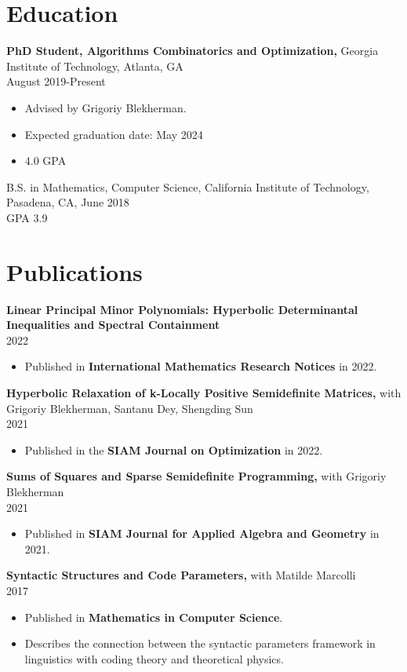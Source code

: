 \documentclass[margin]{res}
\begin{document}
 
 

\begin{resume} 

\section{Education} 
 {\bf PhD Student, Algorithms Combinatorics and Optimization,} Georgia Institute of Technology, Atlanta, GA\\ August 2019-Present
 \begin{itemize} \itemsep -2pt  %
 \item Advised by Grigoriy Blekherman.
 \item Expected graduation date: May 2024
 \item 4.0 GPA
 \end{itemize}

B.S. in Mathematics, Computer Science, California Institute of Technology, Pasadena, CA, June 2018 \\
GPA 3.9

\section{Publications}
{\bf  Linear Principal Minor Polynomials: Hyperbolic Determinantal Inequalities and Spectral Containment } \\ 2022
\begin{itemize} \itemsep -2pt %
\item Published in \textbf{International Mathematics Research Notices} in 2022.
\end{itemize}
{\bf    Hyperbolic Relaxation of k-Locally Positive Semidefinite Matrices,} with Grigoriy Blekherman, Santanu Dey, Shengding Sun\\ 2021
\begin{itemize} \itemsep -2pt %
\item Published in the \textbf{SIAM Journal on Optimization} in 2022.
\end{itemize}
{\bf   Sums of Squares and Sparse Semidefinite Programming,} with Grigoriy Blekherman \\ 2021
\begin{itemize} \itemsep -2pt %
\item Published in \textbf{SIAM Journal for Applied Algebra and Geometry} in 2021.
\end{itemize}
{\bf  Syntactic Structures and Code Parameters,} with Matilde Marcolli \\ 2017
\begin{itemize} \itemsep -2pt %
\item Published in \textbf{Mathematics in Computer Science}.
\item Describes the connection between the syntactic parameters framework in linguistics with coding theory and theoretical physics.
\end{itemize}


\end{resume}
\end{document}
